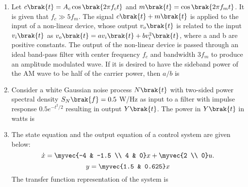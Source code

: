 \documentclass[a4paper, 11pt]{article}
\begin{document}
\begin{enumerate}
    \hfill{}

    \item Let $c\brak{t}=A_c\cos\brak{2\pi f_c t}$ and $m\brak{t}=\cos\brak{2\pi f_m t}$. It is given that $f_c \gg 5f_m$. The signal $c\brak{t}+m\brak{t}$ is applied to the input of a non-linear device, whose output $v_o\brak{t}$ is related to the input $v_i\brak{t}$ as $v_o\brak{t} = av_i\brak{t} + bv_i^2\brak{t}$, where a and b are positive constants. The output of the non-linear device is passed through an ideal band-pass filter with center frequency $f_c$ and bandwidth $3f_m$ to produce an amplitude modulated  wave. If it is desired to have the sideband power of the AM wave to be half of the carrier power, then $a/b$ is
    \begin{enumerate}
    \end{enumerate}

    \hfill{}

    \item Consider a white Gaussian noise process $N\brak{t}$ with two-sided power spectral density $S_N\brak{f}=0.5$ W/Hz as input to a filter with impulse response $0.5e^{-t^2/2}$  resulting in output $Y\brak{t}$. The power in $Y\brak{t}$ in watts is
    \begin{enumerate}
    \end{enumerate}

    \hfill{}

    \item The state equation and the output equation of a control system are given below:
    \[ \dot{x} = \myvec{-4 & -1.5 \\ 4 & 0} x + \myvec{2 \\ 0} u. \]
    \[ y = \myvec{1.5 & 0.625} x \]
    The transfer function representation of the system is
    \begin{enumerate}
    \end{enumerate}


\end{enumerate}
\end{document}
